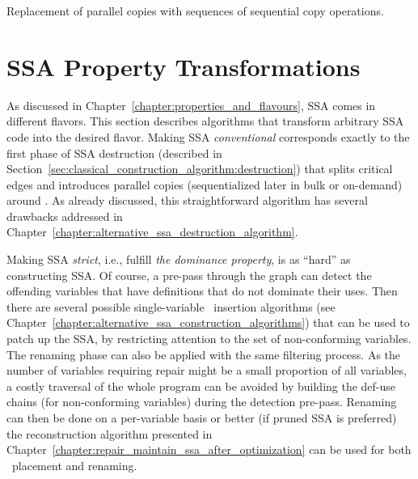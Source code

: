 {\begin{algorithm}[h]
\caption{\label{alg:ssadestruction:sequentialization}Replacement of
  parallel copies with sequences of sequential copy operations.}
\end{algorithm}



\section{SSA Property Transformations}
\label{section:classical_construction_algorithm:turning}
As discussed in Chapter~\ref{chapter:properties_and_flavours},
SSA comes in different flavors. 
This section describes algorithms that transform
arbitrary SSA code
into the desired flavor.
%
Making SSA \emph{conventional} corresponds exactly to the first phase of SSA destruction (described in Section~\ref{sec:classical_construction_algorithm:destruction}) that splits critical edges and introduces parallel copies (sequentialized later in bulk or on-demand) around \phifuns. As already discussed, this straightforward algorithm has several drawbacks addressed in Chapter~\ref{chapter:alternative_ssa_destruction_algorithm}.

Making SSA \emph{strict}, i.e., fulfill \emph{the dominance property}, is as ``hard'' as constructing SSA. Of course, a pre-pass through the graph can detect the offending variables that have definitions that do not dominate their uses. Then there are several possible single-variable \phifun\ insertion algorithms (see Chapter~\ref{chapter:alternative_ssa_construction_algorithms}) that can be used to patch up the SSA, by restricting attention to the set of non-conforming variables. The renaming phase can also be applied with the same filtering process. As the number of variables requiring repair might be a small proportion of all variables, a costly traversal of the whole program can be avoided by building the def-use chains (for non-conforming variables) during the detection pre-pass. Renaming can then be done on a per-variable basis or better (if pruned SSA is preferred) the reconstruction algorithm presented in Chapter~\ref{chapter:repair_maintain_ssa_after_optimization} can be used for both \phifuns\ placement and renaming.


}
